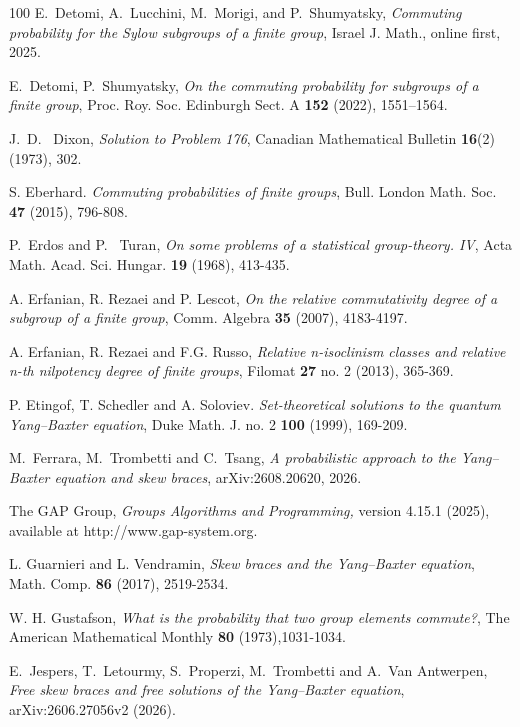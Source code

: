 \documentclass[11pt, oneside]{amsart}
\numberwithin{equation}{section}
\theoremstyle{plain}
\theoremstyle{definition}
\begin{document}
\begin{thebibliography}{100}
E.~Detomi, A.~Lucchini, M.~Morigi, and P.~Shumyatsky,
\emph{Commuting probability for the Sylow subgroups of a finite group},
Israel J. Math., online first, 2025.

 E.~Detomi, P.~Shumyatsky, \emph{On the commuting probability for subgroups of a finite group}, Proc. Roy. Soc. Edinburgh Sect. A {\bf 152} (2022), 1551--1564.

J.~D.~ Dixon, \emph{Solution to Problem 176}, Canadian Mathematical Bulletin {\bf 16}(2) (1973), 302.

S. Eberhard. \emph{Commuting probabilities of finite groups}, Bull. London Math. Soc. {\bf 47} (2015), 796-808.

P.~Erdos and P. ~Turan,  \emph {On some problems of a statistical group-theory. {IV}}, Acta Math. Acad. Sci. Hungar. {\bf 19} (1968), 413-435.

A. Erfanian, R.  Rezaei and  P. Lescot, \emph{On the relative commutativity degree of a subgroup of a finite group},
Comm. Algebra {\bf 35} (2007), 4183-4197.

A. Erfanian, R.  Rezaei and F.G. Russo,
\emph{Relative n-isoclinism classes and relative n-th nilpotency degree of finite groups}, Filomat {\bf 27} no. 2 (2013), 365-369.

 P. Etingof,  T. Schedler and A. Soloviev. {\it Set-theoretical solutions to the quantum Yang--Baxter equation},  Duke Math. J. no. 2 {\bf 100} (1999), 169-209.

M.~Ferrara, M.~Trombetti and C.~Tsang,
\emph{A probabilistic approach to the Yang--Baxter equation and skew braces},
arXiv:2608.20620, 2026.
 
The GAP Group, \emph{Groups Algorithms and Programming,}  version 4.15.1 (2025), available at  http://www.gap-system.org.

 L. Guarnieri  and  L. Vendramin, \emph{ Skew braces and the Yang--Baxter equation},  Math. Comp. {\bf 86} (2017), 2519-2534.

W. H. Gustafson,  \emph{What is the probability that two group elements commute?}, The American Mathematical Monthly {\bf 80} (1973),1031-1034.

 E.~Jespers, T.~Letourmy, S.~Properzi, M.~Trombetti and A.~Van Antwerpen,
 \emph{Free skew braces and free solutions of the Yang--Baxter equation},
 arXiv:2606.27056v2 (2026).


\end{thebibliography}
\end{document}
